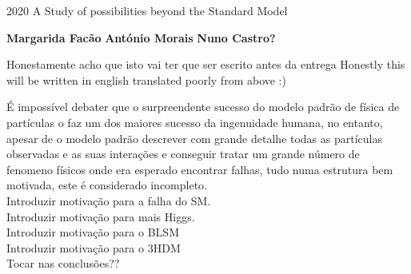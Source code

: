 \documentclass[10pt]{report}
\def\ThesisYear{2020}
\renewcommand{\(}{\left(}
\renewcommand{\)}{\right)}
\renewcommand{\[}{\left[}
\renewcommand{\]}{\right]}
\begin{document}
\TitlePage
%	
  {\ThesisYear}
        { A Study of possibilities beyond the Standard Model}
\EndTitlePage
\titlepage\ \endtitlepage %

\TitlePage
  \vspace*{55mm}
       {}
       {\textbf{Margarida Facão}}
  \vspace*{5mm}
       {\textbf{António Morais}}
  \vspace*{5mm}
  \TEXT{}
       {\textbf{Nuno Castro?}}
  \vspace*{5mm}
\EndTitlePage
\titlepage\ \endtitlepage %

\TitlePage
  \vspace*{55mm}
       {Honestamente acho que isto vai ter que ser escrito antes da entrega }
  \TEXT{}
       {Honestly this will be written in english translated poorly from above :) }
\EndTitlePage
\titlepage\ \endtitlepage %

\TitlePage
  \vspace*{55mm}
       {É impossível debater que o surpreendente sucesso do modelo padrão de física de partículas o faz um dos maiores sucesso da ingenuidade humana, no entanto, apesar de o modelo padrão descrever com grande detalhe todas as partículas observadas e as suas interações e conseguir tratar um grande número de fenomeno  físicos onde era esperado encontrar falhas, tudo numa estrutura bem motivada, este é considerado incompleto. \\ { \color{green} 
Introduzir motivação para a falha do SM. \\
Introduzir motivação para mais Higgs. \\ 
Introduzir motivação para o BLSM \\ 
Introduzir motivação para o 3HDM} \\ 
{\color{blue} Tocar nas conclusões?? }
       }
\EndTitlePage
\titlepage\ \endtitlepage %
\end{document}

